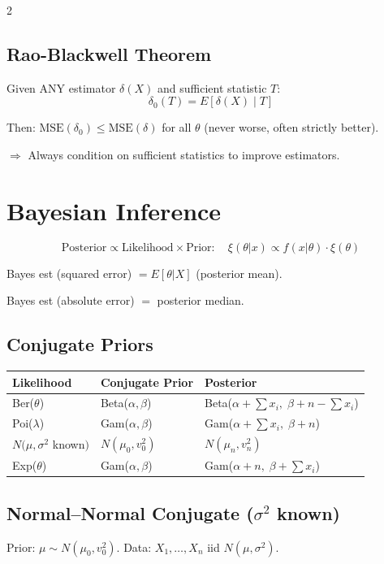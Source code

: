 \documentclass[8pt]{extarticle}
\begin{document}
\begin{multicols}{2}
\subsection{Rao-Blackwell Theorem}

Given ANY estimator $\delta(X)$ and sufficient statistic $T$:
$$\delta_0(T) = E[\delta(X) \mid T]$$

Then: $\text{MSE}(\delta_0) \le \text{MSE}(\delta)$ for all $\theta$ (never worse, often strictly better).

$\Rightarrow$ Always condition on sufficient statistics to improve estimators.

\section{Bayesian Inference}

$$\text{Posterior} \propto \text{Likelihood} \times \text{Prior}: \quad \xi(\theta|x) \propto f(x|\theta) \cdot \xi(\theta)$$

Bayes est (squared error) $= E[\theta|X]$ (posterior mean).

Bayes est (absolute error) $=$ posterior median.

\subsection{Conjugate Priors}

\begin{tabular}{@{}lll@{}}
\toprule
\textbf{Likelihood} & \textbf{Conjugate Prior} & \textbf{Posterior} \\
\midrule
Ber($\theta$) & Beta($\alpha,\beta$) & Beta($\alpha{+}\sum x_i,\; \beta{+}n{-}\sum x_i$) \\[3pt]
Poi($\lambda$) & Gam($\alpha,\beta$) & Gam($\alpha{+}\sum x_i,\; \beta{+}n$) \\[3pt]
$N(\mu,\sigma^2$ known$)$ & $N(\mu_0, v_0^2)$ & $N(\mu_n, v_n^2)$ \\[3pt]
Exp($\theta$) & Gam($\alpha,\beta$) & Gam($\alpha{+}n,\; \beta{+}\sum x_i$) \\
\bottomrule
\end{tabular}

\subsection{Normal--Normal Conjugate ($\sigma^2$ known)}

Prior: $\mu \sim N(\mu_0, v_0^2)$. \quad Data: $X_1,\ldots,X_n$ iid $N(\mu, \sigma^2)$.


\end{multicols}
\end{document}
